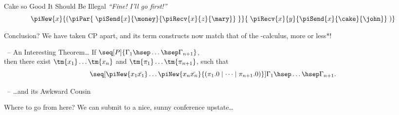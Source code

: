 \documentclass[aspectratio=169,xcolor={dvipsnames,table}]{beamer}
\begin{document}
\begin{frame}{Cake so Good It Should Be Illegal}
  \centering\Huge
  \vfill
  \textit{``Fine! I'll go first!''}
  \vfill
  \[
    \piNew{x}{(\piPar{
      \; \piSend{x}{\money}{\piRecv{x}{z}{\mary}} \;
    }}{
      \; \piRecv{x}{y}{\piSend{x}{\cake}{\john}} \;
    )}
  \]
  \vfill
\end{frame}

{
  \begin{frame}{Conclusion?}
    \centering\Huge
    We have taken CP apart, and its term constructs now match that of the
    \textpi-calculus, more or less*!
  \end{frame}
}

{
  \begin{frame}{\hccp\ -- An Interesting Theorem\dots}
    \centering\Large
    If $\seq[P]{\Gamma_1\hsep \dots\hsep \Gamma_{n+1}}$,\\
    then there exist $\tm{x_1}\dots\tm{x_n}$ and $\tm{\pi_1}\dots\tm{\pi_{n+1}}$,
    such that
    \[
      \seq[\piNew{x_1\bar{x_1}}\dots\piNew{x_n\bar{x_n}}{%
        (\pi_1.0 \mid \dots \mid \pi_{n+1}.0)}]{\Gamma_1\hsep \dots\hsep \Gamma_{n+1}}.
    \]
  \end{frame}
}

\begin{frame}{\hccp\ -- \dots and its Awkward Cousin}
  \centering\Large
\end{frame} 

{
  \begin{frame}{Where to go from here?}
    \centering\Large
    We can submit to a nice, sunny conference upstate\dots
  \end{frame}
}
\end{document}
